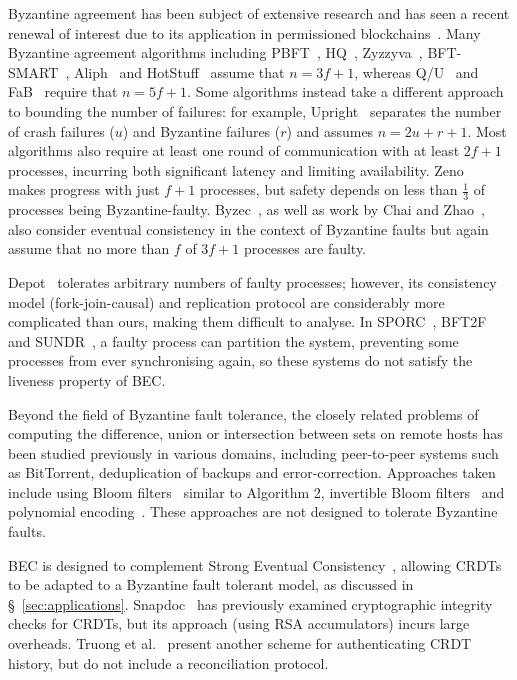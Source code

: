 \documentclass[a4paper,anonymous,USenglish]{lipics-v2019}
\begin{document}
Byzantine agreement has been subject of extensive research and has seen a recent renewal of interest due to its application in permissioned blockchains~\cite{Bano:2019}.
Many Byzantine agreement algorithms including PBFT~\cite{Castro:1999}, HQ~\cite{Cowling:2006}, Zyzzyva~\cite{Kotla:2007}, BFT-SMART~\cite{Bessani:2014}, Aliph~\cite{Aublin:2015} and HotStuff~\cite{Yin:2019} assume that $n=3f+1$, whereas Q/U~\cite{Abd:2005} and FaB~\cite{Martin:2006} require that $n=5f+1$.
Some algorithms instead take a different approach to bounding the number of failures: for example, Upright~\cite{Clement:2009} separates the number of crash failures ($u$) and Byzantine failures ($r$) and assumes $n=2u+r+1$.
Most algorithms also require at least one round of communication with at least $2f+1$ processes, incurring both significant latency and limiting availability.
Zeno~\cite{Singh:2009} makes progress with just $f+1$ processes, but safety depends on less than $\frac{1}{3}$ of processes being Byzantine-faulty.
Byzec~\cite{Shoker:2017}, as well as work by Chai and Zhao~\cite{Chai:2014}, also consider eventual consistency in the context of Byzantine faults but again assume that no more than $f$ of $3f+1$ processes are faulty.

Depot~\cite{Mahajan:2011} tolerates arbitrary numbers of faulty processes; however, its consistency model (fork-join-causal) and replication protocol are considerably more complicated than ours, making them difficult to analyse.
In SPORC~\cite{Feldman:2010wl}, BFT2F~\cite{Li:2007} and SUNDR~\cite{Mazieres:2002}, a faulty process can partition the system, preventing some processes from ever synchronising again, so these systems do not satisfy the liveness property of BEC.

Beyond the field of Byzantine fault tolerance, the closely related problems of computing the difference, union or intersection between sets on remote hosts has been studied previously in various domains, including peer-to-peer systems such as BitTorrent, deduplication of backups and error-correction.
Approaches taken include using Bloom filters~\cite{Skjegstad:2011} similar to Algorithm 2, invertible Bloom filters~\cite{Goodrich:2011,Eppstein:2011} and polynomial encoding~\cite{Minsky:2006}.
These approaches are not designed to tolerate Byzantine faults.

BEC is designed to complement Strong Eventual Consistency~\cite{Shapiro:2011}, allowing CRDTs to be adapted to a Byzantine fault tolerant model, as discussed in \S~\ref{sec:applications}.
Snapdoc~\cite{Kollmann:2019hf} has previously examined cryptographic integrity checks for CRDTs, but its approach (using RSA accumulators) incurs large overheads.
Truong et al.~\cite{Truong:2012et} present another scheme for authenticating CRDT history, but do not include a reconciliation protocol.
\end{document}
